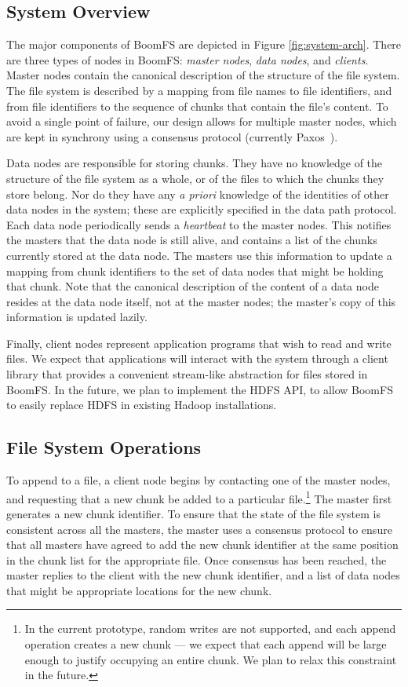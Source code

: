 \documentclass[twocolumn]{article}
\begin{document}
\subsection{System Overview}
The major components of BoomFS are depicted in Figure
\ref{fig:system-arch}. There are three types of nodes in BoomFS:
\emph{master nodes}, \emph{data nodes}, and \emph{clients}. Master
nodes contain the canonical description of the structure of the
file system. The file system is described by a mapping from file names
to file identifiers, and from file identifiers to the sequence of
chunks that contain the file's content. To avoid a single point of
failure, our design allows for multiple master nodes, which are kept
in synchrony using a consensus protocol (currently
Paxos~\cite{paxos-made-simple}).

Data nodes are responsible for storing chunks. They have no knowledge
of the structure of the file system as a whole, or of the files to which  
the chunks they store belong.  Nor do they have any \emph{a priori} knowledge
of the identities of other data nodes in the system;  these are explicitly
specified in the data path protocol.  Each data node periodically sends a
\emph{heartbeat} to the master nodes. This notifies the masters that
the data node is still alive, and contains a list of the chunks
currently stored at the data node. The masters use this information to
update a mapping from chunk identifiers to the set of data nodes that
might be holding that chunk. Note that the canonical description of
the content of a data node resides at the data node itself, not at the
master nodes; the master's copy of this information is updated lazily.

Finally, client nodes represent application programs that wish to read
and write files. We expect that applications will interact with the
system through a client library that provides a convenient stream-like
abstraction for files stored in BoomFS. In the future, we plan to
implement the HDFS API, to allow BoomFS to easily replace HDFS in
existing Hadoop installations. %

\subsection{File System Operations}
\label{fs-ops}
To append to a file, a client node begins by contacting one of the
master nodes, and requesting that a new chunk be added to a particular
file.\footnote{In the current prototype, random writes are not
  supported, and each append operation creates a new chunk --- we
  expect that each append will be large enough to justify occupying an
  entire chunk. We plan to relax this constraint in the future.} The
master first generates a new chunk identifier. To ensure that the
state of the file system is consistent across all the masters, the
master uses a consensus protocol to ensure that all masters have
agreed to add the new chunk identifier at the same position in the
chunk list for the appropriate file. Once consensus has been reached,
the master replies to the client with the new chunk identifier, and a
list of data nodes that might be appropriate locations for the new
chunk.
\end{document}
